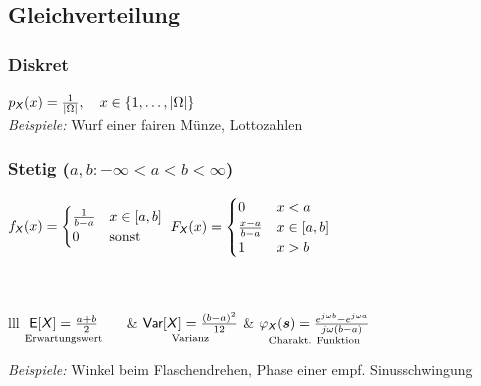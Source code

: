 \documentclass[german,color,6pt]{latex4ei/latex4ei_sheet}
\begin{document}
\begin{sectionbox}
	\subsection{Gleichverteilung}
	\subsubsection{Diskret}
	$p_{\operatorname{\textsf{\textit{X}}}}(x) = \frac{1}{|\Omega|}, \quad x \in \left\{1,\dots,\left\vert\Omega\right\vert\right\}$\\
	\emph{Beispiele:} Wurf einer fairen Münze, Lottozahlen			
	
	\subsubsection{Stetig ($a,b: -\infty < a < b < \infty$)}
	$f_{\operatorname{\textsf{\textit{X}}}}(x) = \begin{cases}
	\frac{1}{b - a} & x \in [a,b] \\
	0 & \text{sonst} \\
	\end{cases}$
	\qquad
	$F_{\operatorname{\textsf{\textit{X}}}}(x) = \begin{cases}
	0 & x < a \\
	\frac{x-a}{b - a} & x \in [a,b] \\
	1 & x > b \\
	\end{cases}$					
	\\ \\  \\ 
	\everymath{\displaystyle}
	\begin{tablebox}{lll}
		$\underset{\text{Erwartungswert}}{\operatorname{\textsf{E}}[\operatorname{\textsf{\textit{X}}}] =\frac{a+b}{2}}\quad\ $ & $\underset{\text{Varianz}}{\operatorname{\textsf{Var}}[\operatorname{\textsf{\textit{X}}}] =\frac{(b-a)^2}{12}}$ & $\underset{\text{Charakt. Funktion}}{\varphi_{\operatorname{\textsf{\textit{X}}}}(\boldsymbol{s}) = \frac{e^{j \omega b}-e^{j \omega a}}{j \omega (b-a)}}$\\ \cbrule
	\end{tablebox}
	\emph{Beispiele:} Winkel beim Flaschendrehen, Phase einer empf. Sinusschwingung
	
\end{sectionbox}
\end{document}
